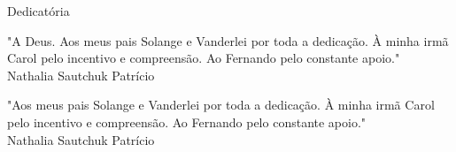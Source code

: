 
\begin{titlepage}
  \begin{center}
    {\ABNTchaptersize\ABNTchapterfont Dedicatória}
  \end{center}

  \begin{flushright}

  \vspace*{\fill}

    "A Deus. Aos meus pais Solange e Vanderlei por toda a dedicação. À minha irmã Carol pelo incentivo e compreensão. Ao Fernando pelo constante apoio." \\ Nathalia Sautchuk Patrício

  \vspace*{\fill}

    "Aos meus pais Solange e Vanderlei por toda a dedicação. À minha irmã Carol pelo incentivo e compreensão. Ao Fernando pelo constante apoio." \\ Nathalia Sautchuk Patrício

  \vspace*{\fill}

  \end{flushright}

\end{titlepage}
